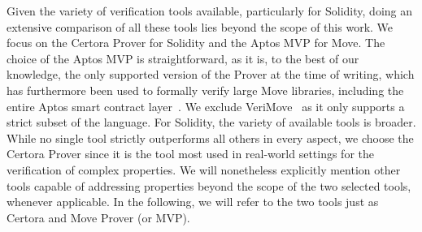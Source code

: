 Given the variety of verification tools available, particularly for Solidity,
doing an extensive comparison of all these tools lies beyond the scope of this work.
We focus on the Certora Prover for Solidity and the Aptos MVP for Move. The choice of the Aptos MVP is straightforward, as it is, to the best of our knowledge, the only supported version of the Prover at the time of writing,
which has furthermore been used to formally verify large Move libraries, including the entire Aptos smart contract layer~\cite{Park24fmbc}.
We exclude VeriMove~\cite{VeriMove} as it only supports a strict subset of the language.
%
For Solidity, the variety of available tools is broader. 
While no single tool strictly outperforms all others in every aspect,
we choose the Certora Prover since it is the tool most used in real-world settings for the verification of complex properties.
We will nonetheless explicitly mention other tools capable of 
addressing 
properties beyond the scope of the two selected tools, whenever applicable. 
In the following, we will refer to the two tools just as Certora and Move Prover (or MVP).
%
